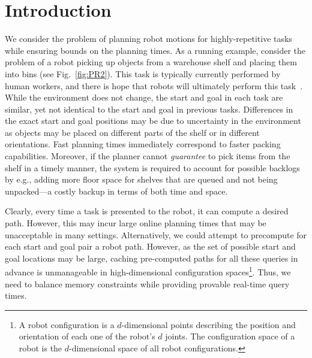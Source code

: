 \documentclass[letterpaper]{article} %
\newcommand{\update}[1]{{\color{magenta}#1}}
\begin{document}
\section{Introduction}
We consider the problem of planning robot motions for highly-repetitive tasks while ensuring bounds on the planning times.
As a running example, consider the problem of a robot picking up objects from a warehouse shelf and placing them into bins (see Fig.~\ref{fig:PR2}). This task is typically currently performed by human workers, and there is hope that robots will ultimately perform this task~\cite{correll2018analysis}.
While the environment does not change, the start and goal in each task are similar, yet not identical to the start and goal in previous tasks.
Differences in the exact start and goal positions may be due to uncertainty in the environment as objects may be placed on different parts of the shelf or in different orientations.
Fast planning times immediately correspond to faster packing capabilities. 
Moreover, if the planner cannot \emph{guarantee} to pick items from the shelf in a timely manner, the system is required to account for possible backlogs by e.g., adding more floor space for shelves that are queued and not being unpacked---a costly backup in terms of both time and space.


Clearly, every time a task is presented to the robot, it can compute a desired path.
However, this may incur large online planning times that may be unacceptable in many settings.
%
Alternatively, we could attempt to precompute for each start and goal pair a robot path.
However, as the set of possible start and goal locations may be large, caching pre-computed paths for all these queries in advance is unmanageable in high-dimensional configuration spaces\footnote{
A robot configuration is a $d$-dimensional points describing the position and orientation of each one of the robot's $d$ joints.
The configuration space of a robot is the $d$-dimensional space of all robot configurations.}.
Thus, we need to balance memory constraints while providing provable real-time query times.
\end{document}
